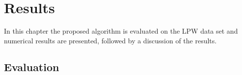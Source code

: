 \chapter{Results}
In this chapter the proposed algorithm is evaluated on the LPW data set and numerical results are presented, followed by a discussion of the results. 
\section{Evaluation}
